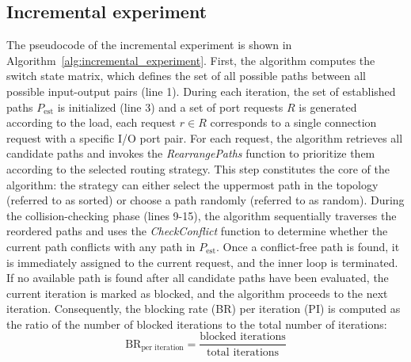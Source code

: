 \subsection{Incremental experiment}\label{subsection:incremental_experiment}
The pseudocode of the incremental experiment is shown in Algorithm~\ref{alg:incremental_experiment}.
First, the algorithm computes the switch state matrix, which defines the set of all possible paths between all possible input-output pairs (line 1).
During each iteration, the set of established paths $P_{\text{est}}$ is initialized (line 3) and a set of port requests $R$ is generated according to the load, each request $r \in R$ corresponds to a single connection request with a specific I/O port pair.
For each request, the algorithm retrieves all candidate paths and invokes the \textit{RearrangePaths} function to prioritize them according to the selected routing strategy.
This step constitutes the core of the algorithm: the strategy can either select the uppermost path in the topology (referred to as sorted) or choose a path randomly (referred to as random).
During the collision-checking phase (lines 9-15), the algorithm sequentially traverses the reordered paths and uses the \textit{CheckConflict} function to determine whether the current path conflicts with any path in $P_{\text{est}}$.
Once a conflict-free path is found, it is immediately assigned to the current request, and the inner loop is terminated.
If no available path is found after all candidate paths have been evaluated, the current iteration is marked as blocked, and the algorithm proceeds to the next iteration.
Consequently, the blocking rate (BR) per iteration (PI) is computed as the ratio of the number of blocked iterations to the total number of iterations:
\begin{equation}
    \label{eq:br_pi}
    \text{BR}_{\text{per iteration}} = \frac{\text{blocked iterations}}{\text{total iterations}}
\end{equation}

